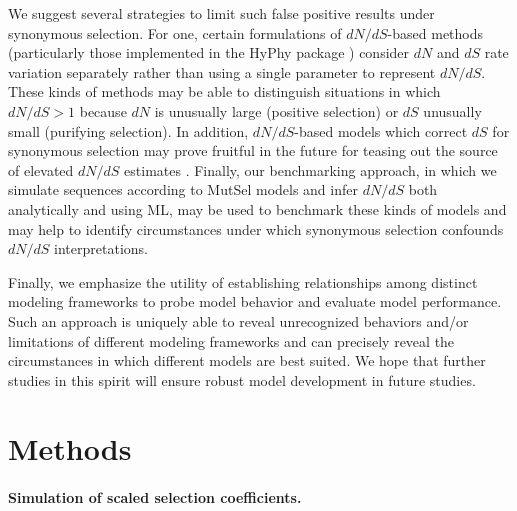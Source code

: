\documentclass{pnastwo}
\begin{document}
\begin{article}
We suggest several strategies to limit such false positive results under synonymous selection. For one, certain formulations of $dN/dS$-based methods (particularly those implemented in the HyPhy package \cite{KosakovskyPondetal2005}) consider $dN$ and $dS$ rate variation separately \cite{MuseGaut1994,KosakovskyPondMuse2005,Murrell2013} rather than using a single parameter to represent $dN/dS$. These kinds of methods may be able to distinguish situations in which $dN/dS>1$ because $dN$ is unusually large (positive selection) or $dS$ unusually small (purifying selection). In addition, $dN/dS$-based models which correct $dS$ for synonymous selection may prove fruitful in the future for teasing out the source of elevated $dN/dS$ estimates \cite{Zhouetal2010}. Finally, our benchmarking approach, in which we simulate sequences according to MutSel models and infer $dN/dS$ both analytically and using ML, may be used to benchmark these kinds of models and may help to identify circumstances under which synonymous selection confounds $dN/dS$ interpretations. 

Finally, we emphasize the utility of establishing relationships among distinct modeling frameworks to probe model behavior and evaluate model performance. Such an approach is uniquely able to reveal unrecognized behaviors and/or limitations of different modeling frameworks and can precisely reveal the circumstances in which different models are best suited. We hope that further studies in this spirit will ensure robust model development in future studies.


\section*{Methods}

\paragraph{Simulation of scaled selection coefficients.}


\end{article}
\end{document}
